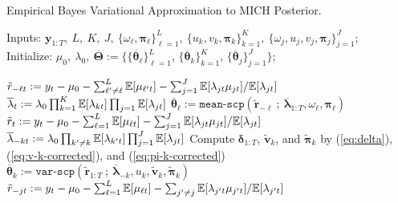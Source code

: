 \begin{algorithm}[!h]
\label{alg:mich-eb}
\caption{Empirical Bayes Variational Approximation to MICH Posterior.}

\small
\SetAlgoLined
  Inputs: $\mathbf{y}_{1:T},\:L,\:K,\:J,\:\{\omega_\ell,\boldsymbol{\pi}_\ell\}_{\ell=1}^L,\:\{u_k,v_k,\boldsymbol{\pi}_k\}_{k=1}^K,\:\{\omega_j,u_j,v_j,\boldsymbol{\pi}_j\}_{j=1}^J;$ \\
  Initialize: $\mu_0,\: \lambda_0,\: \overline{\boldsymbol{\Theta}} := \{\{\overline{\boldsymbol{\theta}}_\ell\}_{\ell=1}^L$, $\{\overline{\boldsymbol{\theta}}_k\}_{k=1}^K$, $\{\overline{\boldsymbol{\theta}}_j\}_{j=1}^J\}$;
  
   {
     {
      $\tilde{r}_{-\ell t} := y_t - \mu_0- \sum_{\ell' \neq \ell}^L \mathbb{E}[\mu_{\ell' t}] - \sum_{j =1}^J \mathbb{E}[\lambda_{jt} \mu_{jt}] / \mathbb{E}[\lambda_{jt}]$ 
      $\overline{\lambda}_{t} := \lambda_0\prod_{k=1}^K \mathbb{E}[\lambda_{kt}]\prod_{j=1}\mathbb{E}[\lambda_{jt}]$  
      $\overline{\boldsymbol{\theta}}_\ell := \texttt{mean-scp}(\tilde{\mathbf{r}}_{-\ell} \:;\: \overline{\boldsymbol{\lambda}}_{1:T}, \omega_{\ell}, \boldsymbol{\boldsymbol{\pi}}_{\ell})$ 
    }
     {
      $\tilde{r}_{t} := y_t - \mu_0 - \sum_{\ell = 1}^L \mathbb{E}[\mu_{\ell t}] - \sum_{j=1}^J \mathbb{E}[\lambda_{jt} \mu_{jt}] / \mathbb{E}[\lambda_{jt}]$  
      $\overline{\lambda}_{-kt} := \lambda_0\prod_{k' \neq k} \mathbb{E}[\lambda_{k't}]\prod_{j=1}^J\mathbb{E}[\lambda_{jt}] $  
      Compute $\boldsymbol{\delta}_{1:T}$, $\tilde{\mathbf{v}}_{k}$, and $\tilde{\boldsymbol{\boldsymbol{\pi}}}_{k}$ by (\ref{eq:delta}), (\ref{eq:v-k-corrected}), and (\ref{eq:pi-k-corrected})  
      $\overline{\boldsymbol{\theta}}_k := \texttt{var-scp}(\tilde{\mathbf{r}}_{1:T} 
      \:;\:\overline{\boldsymbol{\lambda}}_{-k}, u_k, \tilde{\mathbf{v}}_{k}, \tilde{\boldsymbol{\boldsymbol{\pi}}}_k)$ 
    }
     {
      $\tilde{r}_{-jt} := y_t - \mu_0 - \sum_{\ell = 1}^L \mathbb{E}[\mu_{\ell t}] - \sum_{j' \neq j} \mathbb{E}[\lambda_{j't} \mu_{j't}] / \mathbb{E}[\lambda_{j't}]$  
}}
\end{algorithm}
